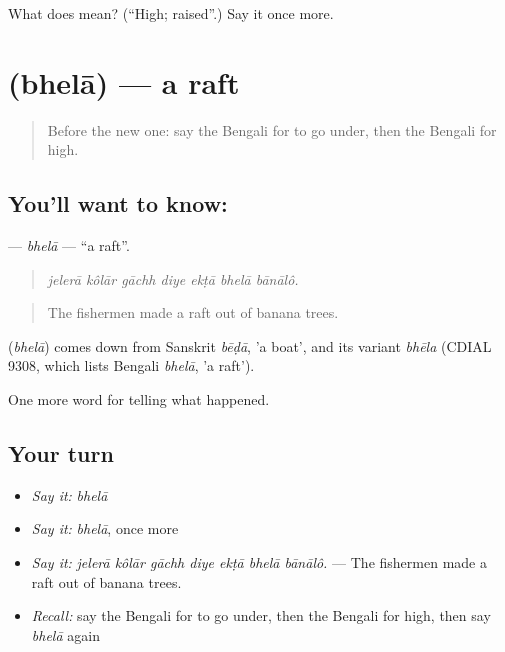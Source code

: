\begin{tcolorbox}[breakable,colback=teal!4,colframe=teal!35!black,title={Before you move on}]
What does  mean? (\textquotedblleft{}High; raised\textquotedblright{}.) Say it once more.
\end{tcolorbox}
\section[\texorpdfstring{\bn{ভেলা} (bhelā)}{ভেলা (bhelā)}]{ (bhelā) — a raft}

\label{lesson:BN-C289-bhela}



\begin{quote}
Before the new one: say the Bengali for to go under, then the Bengali for high.
\end{quote}

\subsection*{You'll want to know: }
\textbf{} — \emph{bhelā} — \textquotedblleft{}a raft\textquotedblright{}.

\begin{quote}
      
\end{quote}

\begin{quote}
\emph{jelerā kôlār gāchh diye ekṭā bhelā bānālô.}
\end{quote}

\begin{quote}
The fishermen made a raft out of banana trees.
\end{quote}

\begin{cousinweb}
\textbf{} (\emph{bhelā}) comes down from Sanskrit \emph{bēḍā}, 'a boat', and its variant \emph{bhēla} (CDIAL 9308, which lists Bengali \emph{bhelā}, 'a raft').
\end{cousinweb}

\begin{grammarlens}[title={What you've built}]
One more word for telling what happened.
\end{grammarlens}

\subsection*{Your turn}
\begin{itemize}
\raggedright
  \item \emph{Say it:} \emph{bhelā}
  \item \emph{Say it:} \emph{bhelā}, once more
  \item \emph{Say it:} \emph{jelerā kôlār gāchh diye ekṭā bhelā bānālô.} — The fishermen made a raft out of banana trees.
  \item \emph{Recall:} say the Bengali for to go under, then the Bengali for high, then say \emph{bhelā} again
\end{itemize}

